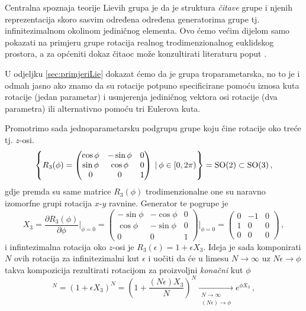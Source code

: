 Centralna spoznaja teorije Lievih grupa je da je struktura \emph{čitave} grupe i
njenih reprezentacija skoro sasvim određena
određena generatorima grupe tj. infinitezimalnom okolinom jediničnog 
elementa.
Ovo ćemo većim dijelom samo pokazati na primjeru grupe rotacija realnog
trodimenzionalnog euklidskog prostora, a za općeniti
dokaz čitaoc može konzultirati literaturu poput \cite{Stilwell:2008}.


U odjeljku \ref{sec:primjeriLie} dokazat ćemo da je grupa  troparametarska,
no to je i odmah jasno ako znamo da su rotacije potpuno specificirane pomoću
iznosa kuta rotacije (jedan parametar) i usmjerenja jediničnog vektora osi rotacije (dva parametra)
ili alternativno pomoću tri Eulerova kuta.

Promotrimo sada jednoparametarsku podgrupu grupe  koju čine
rotacije oko treće tj. $z$-osi.
\begin{displaymath}
\left\{ R_3 (\phi) = 
\begin{pmatrix}
\cos\phi & -\sin\phi & 0 \\
\sin\phi & \cos\phi & 0 \\
0 & 0 & 1 
\end{pmatrix}
 \: | \: \phi \in [0, 2\pi) \right\} = \mathrm{SO}(2) \subset \mathrm{SO}(3) \,,
\end{displaymath}
gdje premda su same matrice $R_3 (\phi)$ trodimenzionalne one su
naravno izomorfne grupi  rotacija $x$-$y$ ravnine.
Generator te pogrupe je
\begin{equation} \label{eq:x3so3}
X_3 = \frac{\partial R_3 (\phi)}{\partial \phi}\Bigg|_{\phi=0}=
\begin{pmatrix}
-\sin\phi & -\cos\phi & 0 \\
\cos\phi & -\sin\phi & 0 \\
0 & 0 & 1 
\end{pmatrix}\Bigg|_{\phi=0} =
\begin{pmatrix}
0 & -1 & 0 \\
1 & 0 & 0 \\
0 & 0 & 0 
\end{pmatrix} \,,
\end{equation}
i infintezimalna rotacija oko $z$-osi je $R_3 (\epsilon) = 1 + \epsilon X_3$.
Ideja je sada komponirati $N$ ovih rotacija za infinitezimalni kut
$\epsilon$ i uočiti da
će u limesu $N \to\infty$ uz $N\epsilon \to \phi$ 
takva kompozicija rezultirati rotacijom za proizvoljni \emph{konačni}
kut $\phi$
\begin{displaymath}
[R_3(\epsilon)]^{N} = (1+\epsilon X_3)^N = \left(1+\frac{(N\epsilon)X_3}
 {N}\right)^N 
 \xrightarrow[\substack{N \to \infty \\ (N\epsilon) \to \phi}]{}
 e^{\phi X_3} \,,
\end{displaymath}
